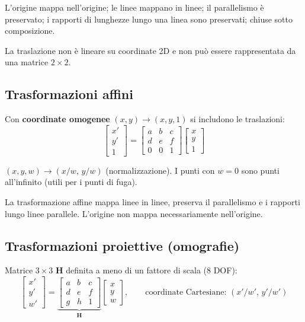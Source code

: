 \documentclass[12pt, a4paper]{report}
\begin{document}
\begin{propbox}[Proprietà]
L'origine mappa nell'origine; le linee mappano in linee; il parallelismo è
preservato; i rapporti di lunghezze lungo una linea sono preservati; chiuse sotto
composizione.
\end{propbox}

\begin{warnbox}
La traslazione non è lineare su coordinate 2D e non può essere rappresentata da
una matrice $2\times2$.
\end{warnbox}

\subsection{Trasformazioni affini}

Con \textbf{coordinate omogenee} $(x,y)\to(x,y,1)$ si includono le traslazioni:
\[
  \begin{bmatrix}x'\\y'\\1\end{bmatrix}=
  \begin{bmatrix}a&b&c\\d&e&f\\0&0&1\end{bmatrix}
  \begin{bmatrix}x\\y\\1\end{bmatrix}
\]

\begin{notebox}
$(x,y,w)\to(x/w,\,y/w)$ (normalizzazione). I punti con $w=0$ sono punti
all'infinito (utili per i punti di fuga).
\end{notebox}

La trasformazione affine mappa linee in linee, preserva il parallelismo e i
rapporti lungo linee parallele. L'origine non mappa necessariamente nell'origine.

\subsection{Trasformazioni proiettive (omografie)}

Matrice $3\times3$ $\mathbf{H}$ definita a meno di un fattore di scala (8 DOF):
\[
  \begin{bmatrix}x'\\y'\\w'\end{bmatrix}=
  \underbrace{\begin{bmatrix}a&b&c\\d&e&f\\g&h&1\end{bmatrix}}_{\mathbf{H}}
  \begin{bmatrix}x\\y\\w\end{bmatrix},
  \qquad \text{coordinate Cartesiane: }(x'/w',\,y'/w')
\]
\end{document}
